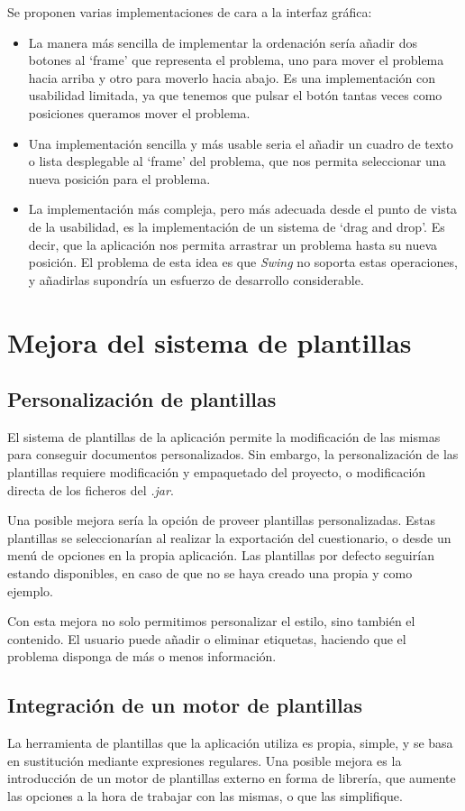 Se proponen varias implementaciones de cara a la interfaz gráfica:
\begin{itemize}
	\item La manera más sencilla de implementar la ordenación sería añadir dos botones al `frame' que representa el problema, uno para mover el problema hacia arriba y otro para moverlo hacia abajo.
	Es una implementación con usabilidad limitada, ya que tenemos que pulsar el botón tantas veces como posiciones queramos mover el problema.
	\item Una implementación sencilla y más usable seria el añadir un cuadro de texto o lista desplegable al `frame' del problema, que nos permita seleccionar una nueva posición para el problema.
	\item La implementación más compleja, pero más adecuada desde el punto de vista de la usabilidad, es la implementación de un sistema de `drag and drop'.
	Es decir, que la aplicación nos permita arrastrar un problema hasta su nueva posición.
	El problema de esta idea es que \emph{Swing} no soporta estas operaciones, y añadirlas supondría un esfuerzo de desarrollo considerable.
\end{itemize}

\section{Mejora del sistema de plantillas}
\subsection{Personalización de plantillas}
El sistema de plantillas de la aplicación permite la modificación de las mismas para conseguir documentos personalizados.
Sin embargo, la personalización de las plantillas requiere modificación y empaquetado del proyecto, o modificación directa de los ficheros del \emph{.jar}.

Una posible mejora sería la opción de proveer plantillas personalizadas.
Estas plantillas se seleccionarían al realizar la exportación del cuestionario, o desde un menú de opciones en la propia aplicación.
Las plantillas por defecto seguirían estando disponibles, en caso de que no se haya creado una propia y como ejemplo.

Con esta mejora no solo permitimos personalizar el estilo, sino también el contenido.
El usuario puede añadir o eliminar etiquetas, haciendo que el problema disponga de más o menos información.

\subsection{Integración de un motor de plantillas}
La herramienta de plantillas que la aplicación utiliza es propia, simple, y se basa en sustitución mediante expresiones regulares.
Una posible mejora es la introducción de un motor de plantillas externo en forma de librería, que aumente las opciones a la hora de trabajar con las mismas, o que las simplifique.